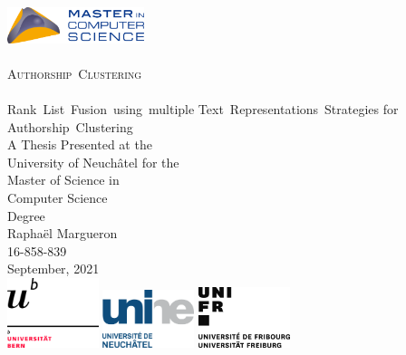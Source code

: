 \begin{titlepage}
  \vspace*{\fill}
  \begin{center}
    \includegraphics[width=0.30\textwidth]{img/MSc_quer.png}
    \\[1.5cm]
    \makebox[\linewidth]{\rule{0.8\paperwidth}{0.6pt}}
    \\[0.9cm]
    {\Huge \scshape Authorship~Clustering}
    \\[0.5cm]
    \makebox[\linewidth]{\rule{0.8\paperwidth}{0.6pt}}
    \\[0.5cm]
    {\Large Rank~List~Fusion~using~multiple Text~Representations~Strategies for Authorship~Clustering}
    \\[2.0cm]
    {\large A Thesis Presented at the \\ University of Neuchâtel for the \\ Master of Science in \\ Computer Science \\ Degree}
    \\[3.5cm]
    {\Large Raphaël Margueron}
    \\
    {\large 16-858-839}
    \\[0.8cm]
    {\large September, 2021}
    \\[4.0cm]
    \includegraphics[width=0.20\textwidth]{img/UNI_Bern.png}
    \hfill
    \includegraphics[width=0.20\textwidth]{img/UNI_Neuenburg.png}
    \hfill
    \includegraphics[width=0.20\textwidth]{img/UNI_Fribourg.png}
  \end{center}
  \vspace*{\fill}
\end{titlepage}
